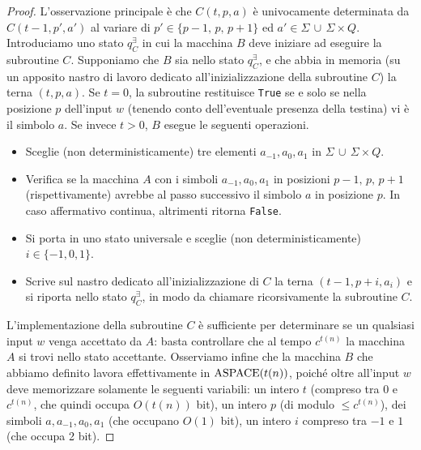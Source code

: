 \begin{proof}
  L'osservazione principale è che $C(t,p,a)$ è univocamente determinata da $C(t-1,p',a')$ al variare di $p'\in\{p-1,\,p,\,p+1\}$ ed $a'\in \Sigma \,\cup\, \Sigma\times Q$.
  Introduciamo uno stato $q_C^\exists$ in cui la macchina $B$ deve iniziare ad eseguire la subroutine $C$.
  Supponiamo che $B$ sia nello stato $q_C^\exists$, e che abbia in memoria (su un apposito nastro di lavoro dedicato all'inizializzazione della subroutine $C$) la terna $(t, p, a)$.
  Se $t=0$, la subroutine restituisce \texttt{True} se e solo se nella posizione $p$ dell'input $w$ (tenendo conto dell'eventuale presenza della testina) vi è il simbolo $a$.
  Se invece $t>0$, $B$ esegue le seguenti operazioni.
  \begin{itemize}
    \item Sceglie (non deterministicamente) tre elementi $a_{-1},a_0,a_1$ in $\Sigma \,\cup\, \Sigma\times Q$.
    \item Verifica se la macchina $A$ con i simboli $a_{-1}, a_0, a_1$ in posizioni $p-1,\,p,\,p+1$ (rispettivamente) avrebbe al passo successivo il simbolo $a$ in posizione $p$.
    In caso affermativo continua, altrimenti ritorna \texttt{False}.
    \item Si porta in uno stato universale e sceglie (non deterministicamente) $i\in\{-1,0,1\}$.
    \item Scrive sul nastro dedicato all'inizializzazione di $C$ la terna $(t-1,p+i,a_i)$ e si riporta nello stato $q_C^\exists$, in modo da chiamare ricorsivamente la subroutine $C$.
  \end{itemize}
  
  L'implementazione della subroutine $C$ è sufficiente per determinare se un qualsiasi input $w$ venga accettato da $A$: basta controllare che al tempo $c^{t(n)}$ la macchina $A$ si trovi nello stato accettante.
  Osserviamo infine che la macchina $B$ che abbiamo definito lavora effettivamente in $\operatorname{ASPACE}(t(n))$, poiché oltre all'input $w$ deve memorizzare solamente le seguenti variabili: un intero $t$ (compreso tra $0$ e $c^{t(n)}$, che quindi occupa $O(t(n))$ bit), un intero $p$ (di modulo $\leq c^{t(n)}$), dei simboli $a,a_{-1},a_0,a_1$ (che occupano $O(1)$ bit), un intero $i$ compreso tra $-1$ e $1$ (che occupa 2 bit).
\end{proof}


